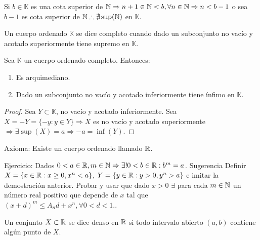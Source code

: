 Si \(b \in \mathbb{K} \) es una cota superior de \(\mathbb{N} \Rightarrow n+1 \in \mathbb{N}<b, \forall n \in \mathbb{N} \Rightarrow n < b-1\) o sea \(b-1\) es cota superior de \(\mathbb{N} \therefore \nexists \sup(\mathbb{N})\) en \(\mathbb{K} \).

\begin{definition}
    Un cuerpo ordenado \(\mathbb{K} \) se dice completo cuando dado un subconjunto no vacío y acotado superiormente tiene supremo en \(\mathbb{K} \).
\end{definition}

\begin{note}
    Sea \(\mathbb{K} \) un cuerpo ordenado completo. Entonces:
    \begin{enumerate}
        \item Es arquimediano.
        \item Dado un subconjunto no vacío y acotado inferiormente tiene ínfimo en \(\mathbb{K} \).
    \end{enumerate}
    \begin{proof}
        Sea \(Y \subset \mathbb{K} \), no vacío y acotado inferiormente. Sea \(X = -Y = \{ -y:y \in Y \} \Rightarrow X\) es no vacío y acotado superiormente \(\Rightarrow \exists \sup(X)=a \Rightarrow -a = \inf(Y)\).
    \end{proof}
\end{note}

Axioma: Existe un cuerpo ordenado llamado \(\mathbb{R} \).


Ejercicio: Dados \(0<a \in \mathbb{R}, m \in \mathbb{N} \Rightarrow \exists! 0<b\in \mathbb{R} : b^m =a\). Sugerencia Definir \(X = \{ x \in \mathbb{R} : x\geq0, x^n<a \} \), \(Y = \{ y \in \mathbb{R} : y>0, y^n >a \} \) e imitar la demostración anterior. Probar y usar que dado \(x>0\) \(\exists \) para cada \(m \in \mathbb{N} \) un número real positivo que depende de \(x\) tal que \((x+d)^m \leq A_nd+x^n, \forall 0<d<1.\).

\begin{definition}
    Un conjunto \(X \subset \mathbb{R} \) se dice denso en \(\mathbb{R} \) si todo intervalo abierto \((a, b)\) contiene algún punto de \(X\).
\end{definition}


